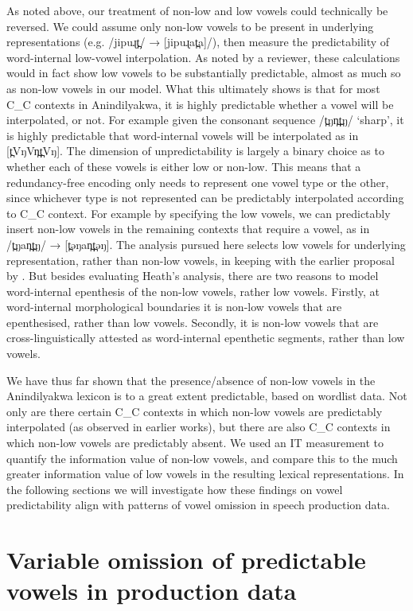 \documentclass[output=paper,colorlinks,citecolor=brown]{langscibook}
\begin{document}
As noted above, our treatment of non-low and low vowels could technically be reversed. We could assume only non-low vowels to be present in underlying representations (e.g. /jipuɻt̪/ → [jipuɻat̪a]/), then measure the predictability of word-internal low-vowel interpolation. As noted by a reviewer, these calculations would in fact show low vowels to be substantially predictable, almost as much so as non-low vowels in our model. What this ultimately shows is that for most C\_C contexts in Anindilyakwa, it is highly predictable whether a vowel will be interpolated, or not. For example given the consonant sequence /t̪ŋn̪t̪ŋ/ `sharp', it is highly predictable that word-internal vowels will be interpolated as in [t̪VŋVn̪t̪Vŋ]. The dimension of unpredictability is largely a binary choice as to whether each of these vowels is either low or non-low. This means that a redundancy-free encoding only needs to represent one vowel type or the other, since whichever type is not represented can be predictably interpolated according to C\_C context. For example by specifying the low vowels, we can predictably insert non-low vowels in the remaining contexts that require a vowel, as in /t̪ŋan̪t̪ŋ/ → [t̪əŋan̪t̪əŋ]. The analysis pursued here selects low vowels for underlying representation, rather than non-low vowels, in keeping with the earlier proposal by \citet{Heath:2020aa}. But besides evaluating Heath's analysis, there are two reasons to model word-internal epenthesis of the non-low vowels, rather low vowels. Firstly, at word-internal morphological boundaries it is non-low vowels that are epenthesised, rather than low vowels. Secondly, it is non-low vowels that are cross-linguistically attested as word-internal epenthetic segments, rather than low vowels.

\newpage
We have thus far shown that the presence/absence of non-low vowels in the Anindilyakwa lexicon is to a great extent predictable, based on wordlist data. Not only are there certain C\_C contexts in which non-low vowels are predictably interpolated (as observed in earlier works), but there are also C\_C contexts in which non-low vowels are predictably absent. We used an IT measurement to quantify the information value of non-low vowels, and compare this to the much greater information value of low vowels in the resulting lexical representations. In the following sections we will investigate how these findings on vowel predictability align with patterns of vowel omission in speech production data.

\section{Variable omission of predictable vowels in production data}\label{sec:mansfield:5}
\end{document}
